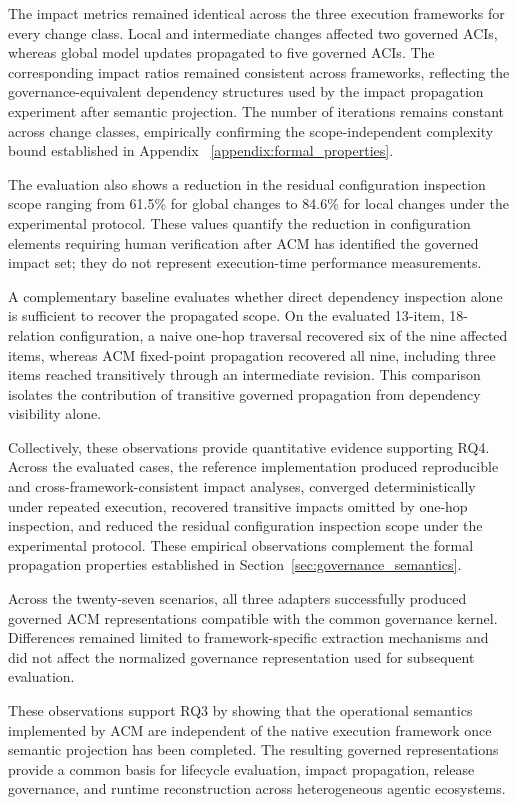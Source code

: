 \documentclass[10pt]{article}
\begin{document}
The impact metrics remained identical across the three execution frameworks for every change class. Local and intermediate changes affected two governed ACIs, whereas global model updates propagated to five governed ACIs. The corresponding impact ratios remained consistent across frameworks, reflecting the governance-equivalent dependency structures used by the impact propagation experiment after semantic projection. The number of iterations remains constant across change classes, empirically confirming the scope-independent complexity bound established in Appendix ~\ref{appendix:formal_properties}.

The evaluation also shows a reduction in the residual configuration inspection scope ranging from 61.5\% for global changes to 84.6\% for local changes under the experimental protocol. These values quantify the reduction in configuration elements requiring human verification after ACM has identified the governed impact set; they do not represent execution-time performance measurements. 

A complementary baseline evaluates whether direct dependency inspection alone is sufficient to recover the propagated scope. On the evaluated 13-item, 18-relation configuration, a naive one-hop traversal recovered six of the nine affected items, whereas ACM fixed-point propagation recovered all nine, including three items reached transitively through an intermediate revision. This comparison isolates the contribution of transitive governed propagation from dependency visibility alone.

Collectively, these observations provide quantitative evidence supporting RQ4. Across the evaluated cases, the reference implementation produced reproducible and cross-framework-consistent impact analyses, converged deterministically under repeated execution, recovered transitive impacts omitted by one-hop inspection, and reduced the residual configuration inspection scope under the experimental protocol. These empirical observations complement the formal propagation properties established in Section~\ref{sec:governance_semantics}.

Across the twenty-seven scenarios, all three adapters successfully produced governed ACM representations compatible with the common governance kernel. Differences remained limited to framework-specific extraction mechanisms and did not affect the normalized governance representation used for subsequent evaluation.

These observations support RQ3 by showing that the operational semantics implemented by ACM are independent of the native execution framework once semantic projection has been completed. The resulting governed representations provide a common basis for lifecycle evaluation, impact propagation, release governance, and runtime reconstruction across heterogeneous agentic ecosystems.
\end{document}
